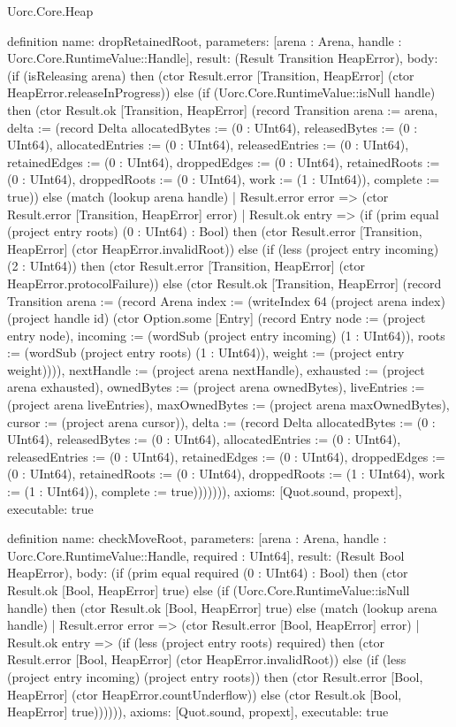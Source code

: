 \begin{lexlean}{Uorc.Core.Heap}
\begin{semanticmodule}
definition{
  name: dropRetainedRoot,
  parameters: [arena : Arena, handle : Uorc.Core.RuntimeValue::Handle],
  result: (Result Transition HeapError),
  body: (if (isReleasing arena) then (ctor Result.error [Transition, HeapError] (ctor HeapError.releaseInProgress)) else (if (Uorc.Core.RuntimeValue::isNull handle) then (ctor Result.ok [Transition, HeapError] (record Transition {arena := arena, delta := (record Delta {allocatedBytes := (0 : UInt64), releasedBytes := (0 : UInt64), allocatedEntries := (0 : UInt64), releasedEntries := (0 : UInt64), retainedEdges := (0 : UInt64), droppedEdges := (0 : UInt64), retainedRoots := (0 : UInt64), droppedRoots := (0 : UInt64), work := (1 : UInt64)}), complete := true})) else (match (lookup arena handle)
    | Result.error error => (ctor Result.error [Transition, HeapError] error)
    | Result.ok entry => (if (prim equal (project entry roots) (0 : UInt64) : Bool) then (ctor Result.error [Transition, HeapError] (ctor HeapError.invalidRoot)) else (if (less (project entry incoming) (2 : UInt64)) then (ctor Result.error [Transition, HeapError] (ctor HeapError.protocolFailure)) else (ctor Result.ok [Transition, HeapError] (record Transition {arena := (record Arena {index := (writeIndex 64 (project arena index) (project handle id) (ctor Option.some [Entry] (record Entry {node := (project entry node), incoming := (wordSub (project entry incoming) (1 : UInt64)), roots := (wordSub (project entry roots) (1 : UInt64)), weight := (project entry weight)}))), nextHandle := (project arena nextHandle), exhausted := (project arena exhausted), ownedBytes := (project arena ownedBytes), liveEntries := (project arena liveEntries), maxOwnedBytes := (project arena maxOwnedBytes), cursor := (project arena cursor)}), delta := (record Delta {allocatedBytes := (0 : UInt64), releasedBytes := (0 : UInt64), allocatedEntries := (0 : UInt64), releasedEntries := (0 : UInt64), retainedEdges := (0 : UInt64), droppedEdges := (0 : UInt64), retainedRoots := (0 : UInt64), droppedRoots := (1 : UInt64), work := (1 : UInt64)}), complete := true}))))))),
  axioms: [Quot.sound, propext],
  executable: true
}

definition{
  name: checkMoveRoot,
  parameters: [arena : Arena, handle : Uorc.Core.RuntimeValue::Handle, required : UInt64],
  result: (Result Bool HeapError),
  body: (if (prim equal required (0 : UInt64) : Bool) then (ctor Result.ok [Bool, HeapError] true) else (if (Uorc.Core.RuntimeValue::isNull handle) then (ctor Result.ok [Bool, HeapError] true) else (match (lookup arena handle)
    | Result.error error => (ctor Result.error [Bool, HeapError] error)
    | Result.ok entry => (if (less (project entry roots) required) then (ctor Result.error [Bool, HeapError] (ctor HeapError.invalidRoot)) else (if (less (project entry incoming) (project entry roots)) then (ctor Result.error [Bool, HeapError] (ctor HeapError.countUnderflow)) else (ctor Result.ok [Bool, HeapError] true)))))),
  axioms: [Quot.sound, propext],
  executable: true
}


\end{semanticmodule}
\end{lexlean}
